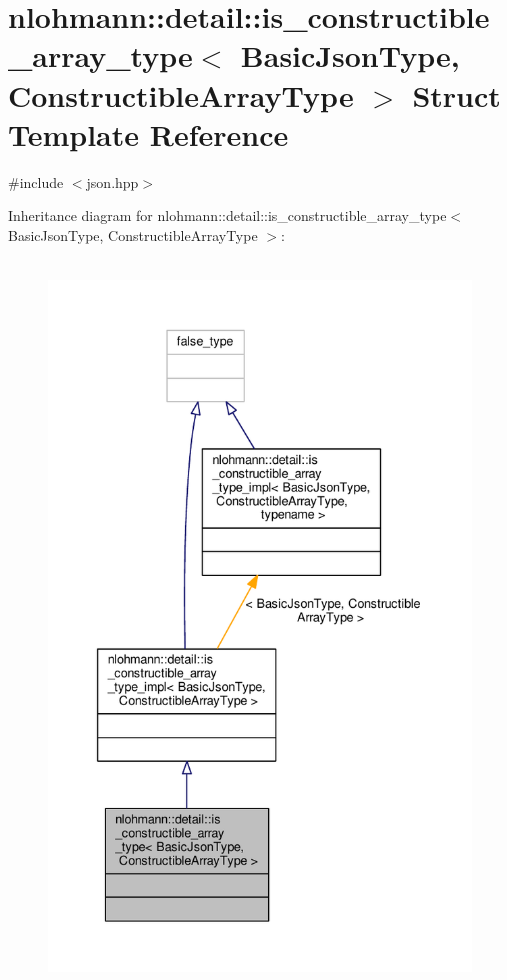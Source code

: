 \hypertarget{structnlohmann_1_1detail_1_1is__constructible__array__type}{}\section{nlohmann\+:\+:detail\+:\+:is\+\_\+constructible\+\_\+array\+\_\+type$<$ Basic\+Json\+Type, Constructible\+Array\+Type $>$ Struct Template Reference}
\label{structnlohmann_1_1detail_1_1is__constructible__array__type}


{\ttfamily \#include $<$json.\+hpp$>$}



Inheritance diagram for nlohmann\+:\+:detail\+:\+:is\+\_\+constructible\+\_\+array\+\_\+type$<$ Basic\+Json\+Type, Constructible\+Array\+Type $>$\+:
\nopagebreak
\begin{figure}[H]
\begin{center}
\leavevmode
\includegraphics[height=550pt]{structnlohmann_1_1detail_1_1is__constructible__array__type__inherit__graph}
\end{center}
\end{figure}



